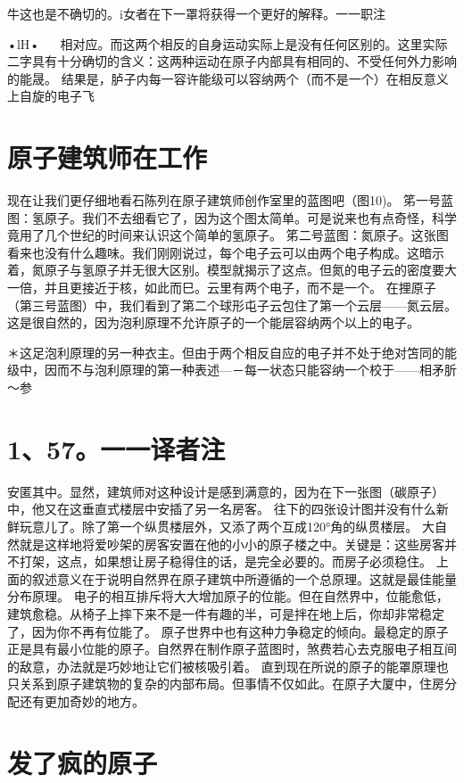 牛这也是不确切的。i女者在下一罩将获得一个更好的解释。一一职注

•lH•
  
相对应。而这两个相反的自身运动实际上是没有任何区别的。这里实际二字具有十分确切的含义：这两种运动在原子内部具有相同的、不受任何外力影响的能晟。
结果是，胪子内每一容许能级可以容纳两个（而不是一个）在相反意义上自旋的电子飞

\section{原子建筑师在工作}

现在让我们更仔细地看石陈列在原子建筑师创作室里的蓝图吧（图10)。
笫一号蓝图：氢原子。我们不去细看它了，因为这个图太简单。可是说来也有点奇怪，科学竟用了几个世纪的时间来认识这个简单的氢原子。
笫二号蓝图：氮原子。这张图看来也没有什么趣味。我们刚刚说过，每个电子云可以由两个电子构成。这暗示着，氮原子与氢原子并无很大区别。模型就揭示了这点。但氮的电子云的密度要大一倍，并且更接近于核，如此而巳。云里有两个电子，而不是一个。
在捚原子（第三号蓝图）中，我们看到了第二个球形屯子云包住了第一个云层——氮云层。这是很自然的，因为泡利原理不允许原子的一个能层容纳两个以上的电子。

＊这足泡利原理的另一种衣主。但由于两个相反自应的电子并不处于绝对笘同的能级中，因而不与泡利原理的第一种表述—－每一状态只能容纳一个校于——相矛肵～参\section{1、57。一一译者注}

安匿其中。显然，建筑师对这种设计是感到满意的，因为在下一张图（碳原子）中，他又在这垂直式楼层中安插了另一名房客。
往下的四张设计图并没有什么新鲜玩意儿了。除了第一个纵贯楼层外，又添了两个互成120°角的纵贯楼层。
大自然就是这样地将爱吵架的房客安置在他的小小的原子楼之中。关键是：这些房客并不打架，这点，如果想让房子稳得住的话，是完全必要的。而房子必须稳住。
上面的叙述意义在于说明自然界在原子建筑中所遵循的一个总原理。这就是最佳能量分布原理。
电子的相互排斥将大大增加原子的位能。但在自然界中，位能愈低，建筑愈稳。从椅子上摔下来不是一件有趣的半，可是拌在地上后，你却非常稳定了，因为你不再有位能了。
原子世界中也有这种力争稳定的倾向。最稳定的原子正是具有最小位能的原子。自然界在制作原子蓝图时，煞费若心去克服电子相互间的敌意，办法就是巧妙地让它们被核吸引着。
直到现在所说的原子的能罩原理也只关系到原子建筑物的复杂的内部布局。但事情不仅如此。在原子大厦中，住房分配还有更加奇妙的地方。

\section{发了疯的原子}

